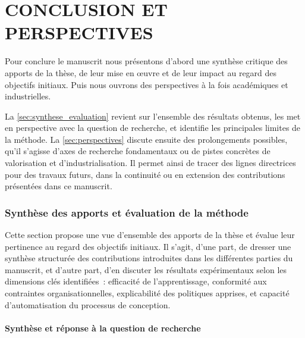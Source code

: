 \clearpage
\thispagestyle{empty}
\null
\newpage

\cleardoublepage
{}
\part*{CONCLUSION ET PERSPECTIVES}
\label{part:conclusion}

\clearpage
\thispagestyle{empty}
\null
\newpage

Pour conclure le manuscrit nous présentons d'abord une synthèse critique des apports de la thèse, de leur mise en œuvre et de leur impact au regard des objectifs initiaux. Puis nous ouvrons des perspectives à la fois académiques et industrielles.

La \autoref{sec:synthese_evaluation} revient sur l'ensemble des résultats obtenus, les met en perspective avec la question de recherche, et identifie les principales limites de la méthode. La \autoref{sec:perspectives} discute ensuite des prolongements possibles, qu’il s’agisse d’axes de recherche fondamentaux ou de pistes concrètes de valorisation et d’industrialisation. Il permet ainsi de tracer des lignes directrices pour des travaux futurs, dans la continuité ou en extension des contributions présentées dans ce manuscrit.


\section*{Synthèse des apports et évaluation de la méthode}
\label{sec:synthese_evaluation}

Cette section propose une vue d’ensemble des apports de la thèse et évalue leur pertinence au regard des objectifs initiaux. Il s’agit, d’une part, de dresser une synthèse structurée des contributions introduites dans les différentes parties du manuscrit, et d’autre part, d’en discuter les résultats expérimentaux selon les dimensions clés identifiées~: efficacité de l’apprentissage, conformité aux contraintes organisationnelles, explicabilité des politiques apprises, et capacité d’automatisation du processus de conception.

\subsection{Synthèse et réponse à la question de recherche}
\label{sec:synthese_recherche}

